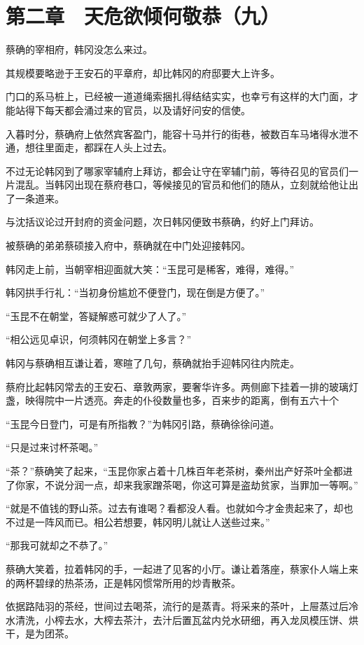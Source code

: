 \section{第二章　天危欲倾何敬恭（九）}

蔡确的宰相府，韩冈没怎么来过。

其规模要略逊于王安石的平章府，却比韩冈的府邸要大上许多。

门口的系马桩上，已经被一道道绳索捆扎得结结实实，也幸亏有这样的大门面，才能站得下每天都会涌过来的官员，以及请好问安的信使。

入暮时分，蔡确府上依然宾客盈门，能容十马并行的街巷，被数百车马堵得水泄不通，想往里面走，都踩在人头上过去。

不过无论韩冈到了哪家宰辅府上拜访，都会让守在宰辅门前，等待召见的官员们一片混乱。当韩冈出现在蔡府巷口，等候接见的官员和他们的随从，立刻就给他让出了一条道来。

与沈括议论过开封府的资金问题，次日韩冈便致书蔡确，约好上门拜访。

被蔡确的弟弟蔡硕接入府中，蔡确就在中门处迎接韩冈。

韩冈走上前，当朝宰相迎面就大笑：“玉昆可是稀客，难得，难得。”

韩冈拱手行礼：“当初身份尴尬不便登门，现在倒是方便了。”

“玉昆不在朝堂，答疑解惑可就少了人了。”

“相公远见卓识，何须韩冈在朝堂上多言？”

韩冈与蔡确相互谦让着，寒暄了几句，蔡确就抬手迎韩冈往内院走。

蔡府比起韩冈常去的王安石、章敦两家，要奢华许多。两侧廊下挂着一排的玻璃灯盏，映得院中一片透亮。奔走的仆役数量也多，百来步的距离，倒有五六十个

“玉昆今日登门，可是有所指教？”为韩冈引路，蔡确徐徐问道。

“只是过来讨杯茶喝。”

“茶？”蔡确笑了起来，“玉昆你家占着十几株百年老茶树，秦州出产好茶叶全都进了你家，不说分润一点，却来我家蹭茶喝，你这可算是盗劫贫家，当罪加一等啊。”

“就是不值钱的野山茶。过去有谁喝？看都没人看。也就如今才金贵起来了，却也不过是一阵风而已。相公若想要，韩冈明儿就让人送些过来。”

“那我可就却之不恭了。”

蔡确大笑着，拉着韩冈的手，一起进了见客的小厅。谦让着落座，蔡家仆人端上来的两杯碧绿的热茶汤，正是韩冈惯常所用的炒青散茶。

依据路陆羽的茶经，世间过去喝茶，流行的是蒸青。将采来的茶叶，上屉蒸过后冷水清洗，小榨去水，大榨去茶汁，去汁后置瓦盆内兑水研细，再入龙凤模压饼、烘干，是为团茶。


